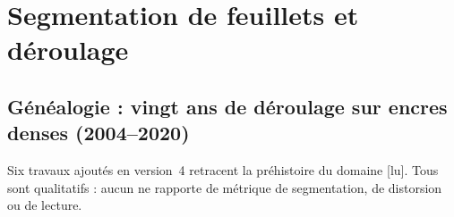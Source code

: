 \documentclass[11pt,a4paper]{article}
\newcommand{\lu}{\textsf{\small[lu]}}
\begin{document}
\section{Segmentation de feuillets et déroulage}

\subsection{Généalogie : vingt ans de déroulage sur encres denses (2004–2020)}
\label{sec:genealogie}

Six travaux ajoutés en version~4 retracent la préhistoire du domaine \lu. Tous sont
qualitatifs : aucun ne rapporte de métrique de segmentation, de distorsion ou de lecture.
\end{document}
